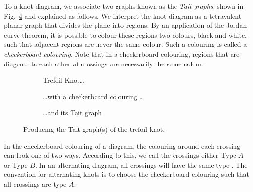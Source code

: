 \documentclass[12pt]{report}
\theoremstyle{upright}
\begin{document}
To a knot diagram, we associate two graphs known as the \textit{Tait graphs}, shown in Fig.~\ref{fig:tait-example} and explained as follows. We interpret the knot diagram as a tetravalent planar graph that divides the plane into regions. By an application of the Jordan curve theorem, it is possible to colour these regions two colours, black and white, such that adjacent regions are never the same colour. Such a colouring is called a \textit{checkerboard colouring}. Note that in a checkerboard colouring, regions that are diagonal to each other at crossings are necessarily the same colour.

\begin{figure}[hbt]
	\centering
	\hspace*{\fill}
	\begin{subfigure}[b]{0.3 \textwidth}
		\centering
		\def\svgscale{0.2}
		
		\caption{Trefoil Knot\dots}
		\label{fig:trefoil-blank}
	\end{subfigure}
	\hspace*{\fill}
	\begin{subfigure}[b]{0.3 \textwidth}
		\centering
		\def\svgscale{0.2}
		
		\caption{\dots with a checkerboard colouring \dots}
		\label{fig:trefoil-checker}
	\end{subfigure}
	\hspace*{\fill}
	\begin{subfigure}[b]{0.3 \textwidth}
		\centering
		\def\svgscale{0.2}
		
		\caption{\dots and its Tait graph}
		\label{fig:trefoil-checker-tait}
	\end{subfigure}
	\hspace*{\fill}
	\caption{Producing the Tait graph(s) of the trefoil knot.}
	\label{fig:tait-example}
\end{figure}


In the checkerboard colouring of a diagram, the colouring around each crossing can look one of two ways. According to this, we call the crossings either Type $A$ or Type $B$. In an alternating diagram, all crossings will have the same type \cite[300]{spanning-tree-expansion-jones-polynomial}. The convention for alternating knots is to choose the checkerboard colouring such that all crossings are type $A$.
\end{document}
